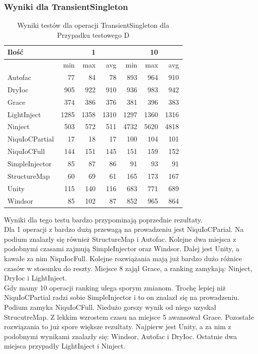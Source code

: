 \documentclass[12pt]{article}
\begin{document}
\subsubsection{Wyniki dla TransientSingleton}
\begin{table}[H]
\captionsetup{belowskip=0pt,aboveskip=0pt}
\begin{center}
\begin{small}
	\begin{tabular}{ | l | r r r | r r r | }
    		\hline
Ilość & & 1 & & & 10 & \\ \hline
 & min & max & avg & min & max & avg \\ \hline
Autofac & 77 & 84 & 78 & 893 & 964 & 910 \\ \hline
DryIoc & 905 & 922 & 910 & 936 & 983 & 942 \\ \hline
Grace & 374 & 386 & 376 & 381 & 396 & 383 \\ \hline
LightInject & 1285 & 1358 & 1310 & 1297 & 1360 & 1316 \\ \hline
Ninject & 503 & 572 & 511 & 4732 & 5620 & 4818 \\ \hline
NiquIoCPartial & 17 & 18 & 17 & 100 & 104 & 101 \\ \hline
NiquIoCFull & 144 & 151 & 145 & 151 & 159 & 152 \\ \hline
SimpleInjector & 85 & 87 & 86 & 91 & 93 & 91 \\ \hline
StructureMap & 60 & 69 & 61 & 165 & 173 & 167 \\ \hline
Unity & 115 & 140 & 116 & 683 & 771 & 689 \\ \hline
Windsor & 85 & 102 & 87 & 852 & 965 & 864 \\ \hline
  	\end{tabular}
\end{small}
\end{center}
\caption{Wyniki testów dla operacji TransientSingleton dla Przypadku testowego D}
\label{TestCaseD_TransientSingleton}
\end{table}
Wyniki dla tego testu bardzo przypominają poprzednie rezultaty.\\
Dla 1 operacji z bardzo dużą przewagą na prowadzeniu jest NiquIoCParial. Na podium znalazły się również StructureMap i Autofac. Kolejne dwa miejsca z podobnymi czasami zajmują SimpleInjector oraz Windsor. Dalej jest Unity, a kawałe za nim NiquIocFull. Kolejne rozwiążania mają już bardzo dużo różnice czasów w stosunku do reszty. Miejsce 8 zajął Grace, a ranking zamykają: Ninject, DryIoc i LightInject.\\
Gdy mamy 10 operacji ranking ulega sporym zmianom. Trochę lepiej niż NiquIoCPartial radzi sobie SimpleInjector i to on znalazł się na prowadzeniu. Podium zamyka NiquIoCFull. Niedużo gorszy wynik od niego uzyskał StrucutreMap. Z lekkim wzrostem czasu na miejsce 5 awansował Grace. Pozostałe rozwiązania to już spore większe rezultaty. Najpierw jest Unity, a za nim z podobnymi wynikami znalazły się: Windsor, Autofac i DryIoc. Ostatnie dwa miejsca przypadły LightInject i Ninject.
\end{document}
